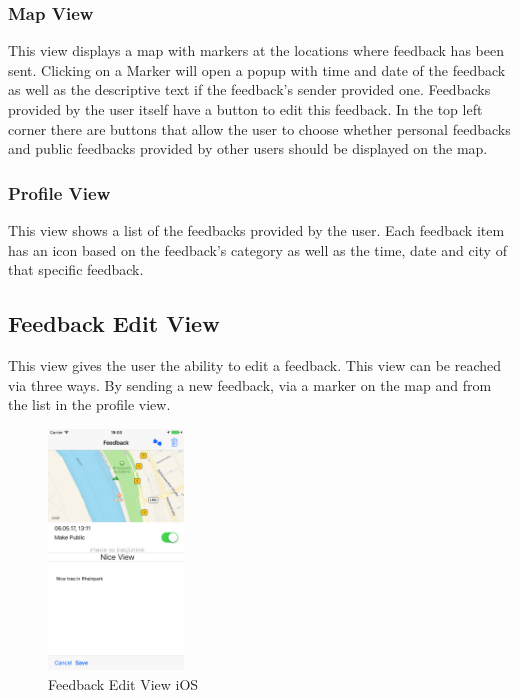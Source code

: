 \subsubsection{Map View} \label{ssec:map}
This view displays a map with markers at the locations where feedback has been sent. Clicking on a Marker will open a popup with time and date of the feedback as well as the descriptive text if the feedback's sender provided one. Feedbacks provided by the user itself have a button to edit this feedback. \newline
In the top left corner there are buttons that allow the user to choose whether personal feedbacks and public feedbacks provided by other users should be displayed on the map.


\subsubsection{Profile View} \label{ssec:profile}
This view shows a list of the feedbacks provided by the user. Each feedback item has an icon based on the feedback's category as well as the time, date and city of that specific feedback.


\subsection{Feedback Edit View}
This view gives the user the ability to edit a feedback. This view can be reached via three ways. By sending a new feedback, via a marker on the map and from the list in the profile view. \newline

\begin{figure}[H]
  \begin{center}
    \includegraphics[width=0.32\textwidth]{bilder/Screenshot_Edit}
    \caption{Feedback Edit View iOS}\label{fig_edit}
  \end{center}
\end{figure}

